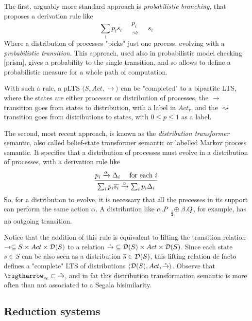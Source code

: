 The first, arguably more standard approach is \textit{probabilistic branching}, that proposes a derivation rule like
\[ \sum_i p_i \overline{s_i} \quad
\substack{  p_i  \\  \rightsquigarrow } 
\quad s_i \]
Where a distribution of processes "picks" just one process, evolving with a \textit{probabilistic transition}. This approach, used also in probabilistic model checking [prism], gives a probability to the single transition, and so allows to define a probabilistic measure for a whole path of computation.

With such a rule, a pLTS $\langle S, Act, \rightarrow\rangle$ can be "completed" to a bipartite LTS, where the states are either processer or distribution of processes, the $\rightarrow$ transition goes from states to distribution, with a label in $Act_\tau$, and the $\rightsquigarrow$ transition goes from distributions to states, with $0 \leq p \leq 1$ as a label. 

The second, most recent approach, is known as the \textit{distribution transformer} semantic, also called belief-state transformer semantic or labelled Markov process semantic. It specifies that a distribution of processes must evolve in a distribution of processes, with a derivation rule like 
\[ \infer{ \sum_i p_i \overline{s_i} \xrightarrow{\alpha} \sum_i p_i \Delta_i}
  { p_i \xrightarrow{\alpha} \Delta_i & \text{ for each  }i }
\]
So, for a distribution to evolve, it is necessary that all the precesses in its support can perform the same action $\alpha$. A distribution like $\alpha.P \psum{\frac{1}{2}} \beta.Q$, for example, has no outgoing transition.

Notice that the addition of this rule is equivalent to lifting the transition relation $\rightarrow \subseteq S \times Act \times \mathcal{D}(S)$ to a relation $\mathring{\rightarrow} \subseteq \mathcal{D}(S) \times Act \times \mathcal{D}(S)$. Since each state $s \in S$ can be also seen as a distribution $\overline{s} \in \mathcal{D}(S)$, this lifting relation de facto defines a "complete" LTS of distributions $\langle \mathcal{D}(S), Act, \mathring{\rightarrow}\rangle$. Observe that $\rigtharrow_{cc} \subset \mathring{\rightarrow}$, and in fat this distribution transformation semantic is more often than not associated to a Segala bisimilarity.



\subsection{Reduction systems}

